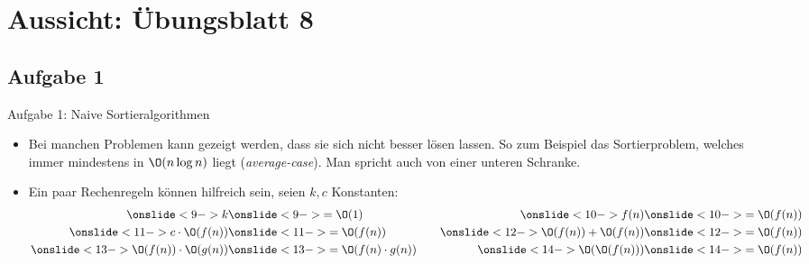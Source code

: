 \iffull
{}
\section{Aussicht: Übungsblatt 8}
\subsection{Aufgabe 1}
\begin{frame}{Aufgabe 1: Naive Sortieralgorithmen}
\begin{itemize}[<+(1)->]
    \itemsep12pt
    \item Bei manchen Problemen kann gezeigt werden,\pause{} dass sie sich nicht besser lösen lassen.\pause{} So zum Beispiel das Sortierproblem,\pause{} welches immer mindestens in \(\O(n \log n)\) liegt (\emph{average-case}).\pause{} Man spricht auch von einer unteren Schranke.
    \item Ein paar Rechenregeln können hilfreich sein,\pause{} seien \(k, c\) Konstanten:\pause{}
    \begin{alignat*}{3}
        \onslide<9->{k} &\onslide<9->{= \O(1)} &\onslide<10->{ f(n)} &\onslide<10->{= \O(f(n))} \\
        \onslide<11->{c \cdot \O(f(n))} &\onslide<11->{= \O(f(n))}&\onslide<12->{ \O(f(n)) + \O(f(n))} &\onslide<12->{= \O(f(n))} \\
        \onslide<13->{\O(f(n)) \cdot \O(g(n))} &\onslide<13->{= \O(f(n) \cdot g(n))}\quad & \onslide<14->{\O(\O(f(n)))} &\onslide<14->{= \O(f(n))}
    \end{alignat*}
\end{itemize}
\end{frame}

